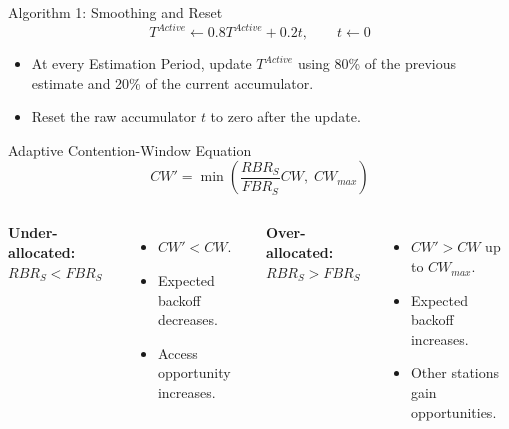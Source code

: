 \begin{frame}{Algorithm 1: Smoothing and Reset}
\[
\boxed{T^{Active}\leftarrow0.8T^{Active}+0.2t},\qquad
\boxed{t\leftarrow0}
\]
\begin{center}
\end{center}
\vspace{0.45cm}
\begin{itemize}
\item At every Estimation Period, update $T^{Active}$ using 80\% of the previous estimate and 20\% of the current accumulator.
\item Reset the raw accumulator $t$ to zero after the update.
\end{itemize}
\end{frame}

\begin{frame}{Adaptive Contention-Window Equation}
\[
\boxed{CW'=\min\!\left(\frac{RBR_S}{FBR_S}CW,\;CW_{max}\right)}
\]
\begin{columns}[T,onlytextwidth]
\textbf{Under-allocated: $RBR_S<FBR_S$}
\begin{itemize}
\item $CW'<CW$.
\item Expected backoff decreases.
\item Access opportunity increases.
\end{itemize}
\textbf{Over-allocated: $RBR_S>FBR_S$}
\begin{itemize}
\item $CW'>CW$ up to $CW_{max}$.
\item Expected backoff increases.
\item Other stations gain opportunities.
\end{itemize}
\end{columns}
\end{frame}

